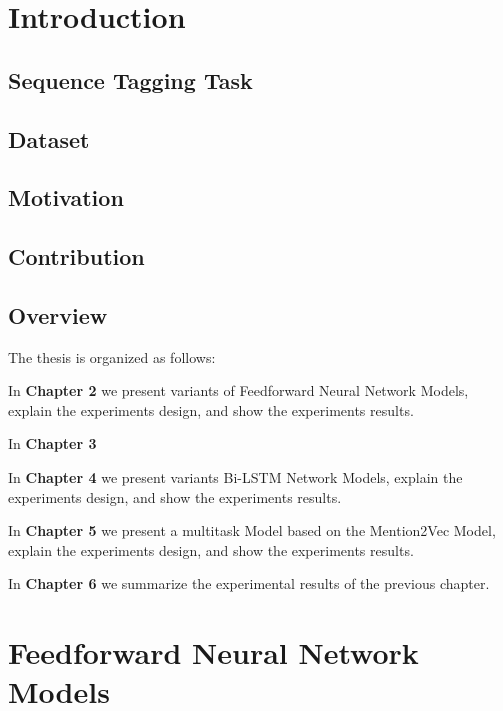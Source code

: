 \documentclass{sfuthesis}
\begin{document}
\mainmatter%

\chapter{Introduction}


\section{Sequence Tagging Task}

\section{Dataset}

\section{Motivation}


\section{Contribution}



\section{Overview}
The thesis is organized as follows:

In \textbf{Chapter 2}  we present variants of Feedforward Neural Network Models, explain the experiments design, and show the experiments results.

In \textbf{Chapter 3} 

In \textbf{Chapter 4} we present variants Bi-LSTM Network Models, explain the experiments design, and show the experiments results.

In \textbf{Chapter 5} we present a multitask Model based on the Mention2Vec Model, explain the experiments design, and show the experiments results.

In \textbf{Chapter 6} we summarize the experimental results of the previous chapter.

\chapter{Feedforward Neural Network Models}
\end{document}
